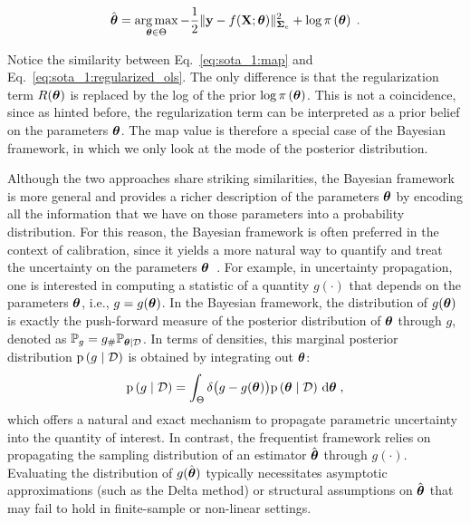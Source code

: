 \begin{equation}
   \hat{\boldsymbol{\theta}} = \operatorname*{arg\,max}_{\boldsymbol{\theta} \in \Theta} -\frac{1}{2} \|\mathbf{y} - f(\mathbf{X};\boldsymbol{\theta})\|_{\boldsymbol{\Sigma}_e}^2 + \log \pi \left( \boldsymbol{\theta}\right) \;.
    \label{eq:sota_1:map}
\end{equation}

Notice the similarity between Eq.~\eqref{eq:sota_1:map} and Eq.~\eqref{eq:sota_1:regularized_ols}. The only difference is that the regularization term $R(\boldsymbol{\theta})$ is replaced by the log of the prior $\log \pi \left( \boldsymbol{\theta}\right)$. This is not a coincidence, since as hinted before, the regularization term can be interpreted as a prior belief on the parameters $\boldsymbol{\theta}$. The \gls{map} value is therefore a special case of the Bayesian framework, in which we only look at the mode of the posterior distribution. 

\smallskip
Although the two approaches share striking similarities, the Bayesian framework is more general and provides a richer description of the parameters $\boldsymbol{\theta}$ by encoding all the information that we have on those parameters into a probability distribution. For this reason, the Bayesian framework is often preferred in the context of calibration, since it yields a more natural way to quantify and treat the uncertainty on the parameters $\boldsymbol{\theta}$~\cite{uq_theory}. For example, in uncertainty propagation, one is interested in computing a statistic of a quantity $g(\cdot)$ that depends on the parameters $\boldsymbol{\theta}$, i.e., $g = g(\boldsymbol{\theta})$. In the Bayesian framework, the distribution of $g(\boldsymbol{\theta})$ is exactly the push-forward measure of the posterior distribution of $\boldsymbol{\theta}$ through $g$, denoted as $\mathbb{P}_g = g_{\#}\mathbb{P}_{\boldsymbol{\theta} \mid \mathcal{D}}$. In terms of densities, this marginal posterior distribution $\mathrm{p} \left( g \mid \mathcal{D} \right)$ is obtained by integrating out $\boldsymbol{\theta}$:
\begin{equation}
  \mathrm{p} \left( g \mid \mathcal{D} \right) = \int_{\Theta} \delta\big(g - g(\boldsymbol{\theta})\big) \mathrm{p} \left( \boldsymbol{\theta} \mid \mathcal{D} \right) \, \text{d}\boldsymbol{\theta}\;,
\end{equation}
which offers a natural and exact mechanism to propagate parametric uncertainty into the quantity of interest. In contrast, the frequentist framework relies on propagating the sampling distribution of an estimator $\hat{\boldsymbol{\theta}}$ through $g(\cdot)$. Evaluating the distribution of $g(\hat{\boldsymbol{\theta}})$ typically necessitates asymptotic approximations (such as the Delta method) or structural assumptions on $\hat{\boldsymbol{\theta}}$ that may fail to hold in finite-sample or non-linear settings.

